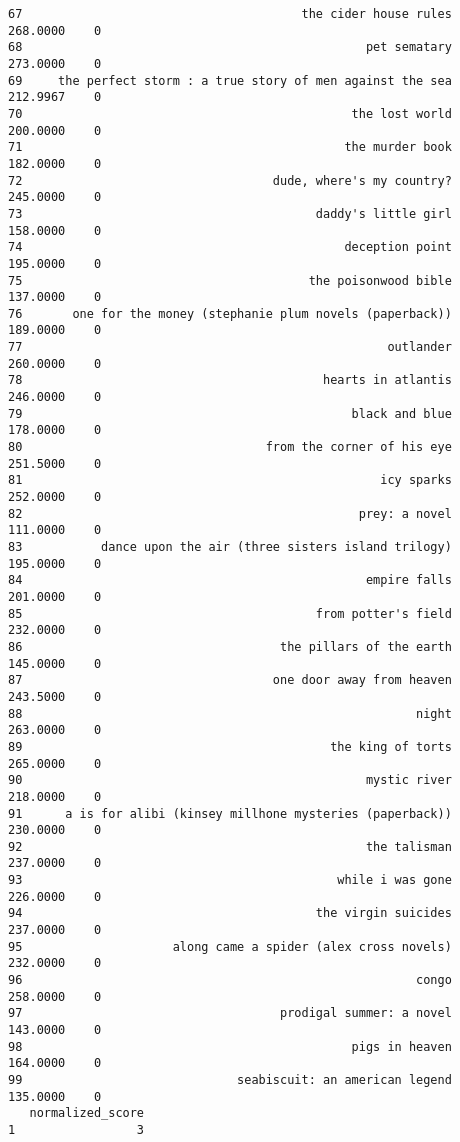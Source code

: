 \documentclass[
]{report}
\begin{document}
\begin{verbatim}
67                                       the cider house rules  268.0000    0
68                                                pet sematary  273.0000    0
69     the perfect storm : a true story of men against the sea  212.9967    0
70                                              the lost world  200.0000    0
71                                             the murder book  182.0000    0
72                                   dude, where's my country?  245.0000    0
73                                         daddy's little girl  158.0000    0
74                                             deception point  195.0000    0
75                                        the poisonwood bible  137.0000    0
76       one for the money (stephanie plum novels (paperback))  189.0000    0
77                                                   outlander  260.0000    0
78                                          hearts in atlantis  246.0000    0
79                                              black and blue  178.0000    0
80                                  from the corner of his eye  251.5000    0
81                                                  icy sparks  252.0000    0
82                                               prey: a novel  111.0000    0
83           dance upon the air (three sisters island trilogy)  195.0000    0
84                                                empire falls  201.0000    0
85                                         from potter's field  232.0000    0
86                                    the pillars of the earth  145.0000    0
87                                   one door away from heaven  243.5000    0
88                                                       night  263.0000    0
89                                           the king of torts  265.0000    0
90                                                mystic river  218.0000    0
91      a is for alibi (kinsey millhone mysteries (paperback))  230.0000    0
92                                                the talisman  237.0000    0
93                                            while i was gone  226.0000    0
94                                         the virgin suicides  237.0000    0
95                     along came a spider (alex cross novels)  232.0000    0
96                                                       congo  258.0000    0
97                                    prodigal summer: a novel  143.0000    0
98                                              pigs in heaven  164.0000    0
99                              seabiscuit: an american legend  135.0000    0
   normalized_score
1                 3

\end{verbatim}
\end{document}
